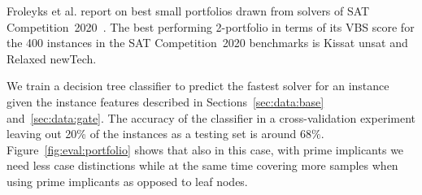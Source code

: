 \documentclass[a4paper, USenglish, cleveref, autoref, thm-restate]{lipics-v2021}
\theoremstyle{definition}
\begin{document}
Froleyks et al. report on best small portfolios drawn from solvers of SAT Competition~2020~\cite{Froleyks:2021:SC2020}. 
The best performing 2-portfolio in terms of its VBS score for the 400 instances in the SAT Competition~2020 benchmarks is \textsf{Kissat unsat} and \textsf{Relaxed newTech}. 

We train a decision tree classifier to predict the fastest solver for an instance given the instance features described in Sections~\ref{sec:data:base} and~\ref{sec:data:gate}. 
The accuracy of the classifier in a cross-validation experiment leaving out 20\% of the instances as a testing set is around $68\%$. 
Figure~\ref{fig:eval:portfolio} shows that also in this case, with prime implicants we need less case distinctions while at the same time covering more samples when using prime implicants as opposed to leaf nodes.
\end{document}
